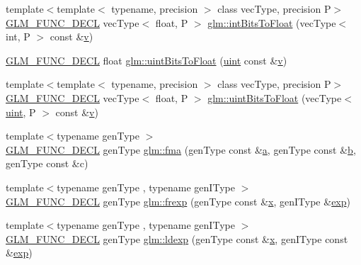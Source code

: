 \begin{DoxyCompactItemize}
\item 
{\footnotesize template$<$template$<$ typename, precision $>$ class vec\+Type, precision P$>$ }\\\mbox{\hyperlink{setup_8hpp_ab2d052de21a70539923e9bcbf6e83a51}{G\+L\+M\+\_\+\+F\+U\+N\+C\+\_\+\+D\+E\+CL}} vec\+Type$<$ float, P $>$ \mbox{\hyperlink{group__core__func__common_gad21ab176dd0e6b59d923db5efca87f4e}{glm\+::int\+Bits\+To\+Float}} (vec\+Type$<$ int, P $>$ const \&\mbox{\hyperlink{glad_8h_a14cfbe2fc2234f5504618905b69d1e06}{v}})
\item 
\mbox{\hyperlink{setup_8hpp_ab2d052de21a70539923e9bcbf6e83a51}{G\+L\+M\+\_\+\+F\+U\+N\+C\+\_\+\+D\+E\+CL}} float \mbox{\hyperlink{group__core__func__common_ga97464ca9ff4267de30ea408f700d4ca8}{glm\+::uint\+Bits\+To\+Float}} (\mbox{\hyperlink{group__core__precision_ga4fd29415871152bfb5abd588334147c8}{uint}} const \&\mbox{\hyperlink{glad_8h_a14cfbe2fc2234f5504618905b69d1e06}{v}})
\item 
{\footnotesize template$<$template$<$ typename, precision $>$ class vec\+Type, precision P$>$ }\\\mbox{\hyperlink{setup_8hpp_ab2d052de21a70539923e9bcbf6e83a51}{G\+L\+M\+\_\+\+F\+U\+N\+C\+\_\+\+D\+E\+CL}} vec\+Type$<$ float, P $>$ \mbox{\hyperlink{group__core__func__common_ga3acab37650ecd792dc84548094b58684}{glm\+::uint\+Bits\+To\+Float}} (vec\+Type$<$ \mbox{\hyperlink{group__core__precision_ga4fd29415871152bfb5abd588334147c8}{uint}}, P $>$ const \&\mbox{\hyperlink{glad_8h_a14cfbe2fc2234f5504618905b69d1e06}{v}})
\item 
{\footnotesize template$<$typename gen\+Type $>$ }\\\mbox{\hyperlink{setup_8hpp_ab2d052de21a70539923e9bcbf6e83a51}{G\+L\+M\+\_\+\+F\+U\+N\+C\+\_\+\+D\+E\+CL}} gen\+Type \mbox{\hyperlink{group__core__func__common_gad0f444d4b81cc53c3b6edf5aa25078c2}{glm\+::fma}} (gen\+Type const \&\mbox{\hyperlink{glad_8h_ac8729153468b5dcf13f971b21d84d4e5}{a}}, gen\+Type const \&\mbox{\hyperlink{glad_8h_a6eba317e3cf44d6d26c04a5a8f197dcb}{b}}, gen\+Type const \&c)
\item 
{\footnotesize template$<$typename gen\+Type , typename gen\+I\+Type $>$ }\\\mbox{\hyperlink{setup_8hpp_ab2d052de21a70539923e9bcbf6e83a51}{G\+L\+M\+\_\+\+F\+U\+N\+C\+\_\+\+D\+E\+CL}} gen\+Type \mbox{\hyperlink{group__core__func__common_ga20620e83544d1a988857a3bc4ebe0e1d}{glm\+::frexp}} (gen\+Type const \&\mbox{\hyperlink{glad_8h_a92d0386e5c19fb81ea88c9f99644ab1d}{x}}, gen\+I\+Type \&\mbox{\hyperlink{group__core__func__exponential_ga25e54a7f44fc49ec6ac6ffc7675cf04a}{exp}})
\item 
{\footnotesize template$<$typename gen\+Type , typename gen\+I\+Type $>$ }\\\mbox{\hyperlink{setup_8hpp_ab2d052de21a70539923e9bcbf6e83a51}{G\+L\+M\+\_\+\+F\+U\+N\+C\+\_\+\+D\+E\+CL}} gen\+Type \mbox{\hyperlink{group__core__func__common_ga52e319d7289b849ec92055abd4830533}{glm\+::ldexp}} (gen\+Type const \&\mbox{\hyperlink{glad_8h_a92d0386e5c19fb81ea88c9f99644ab1d}{x}}, gen\+I\+Type const \&\mbox{\hyperlink{group__core__func__exponential_ga25e54a7f44fc49ec6ac6ffc7675cf04a}{exp}})
\end{DoxyCompactItemize}


